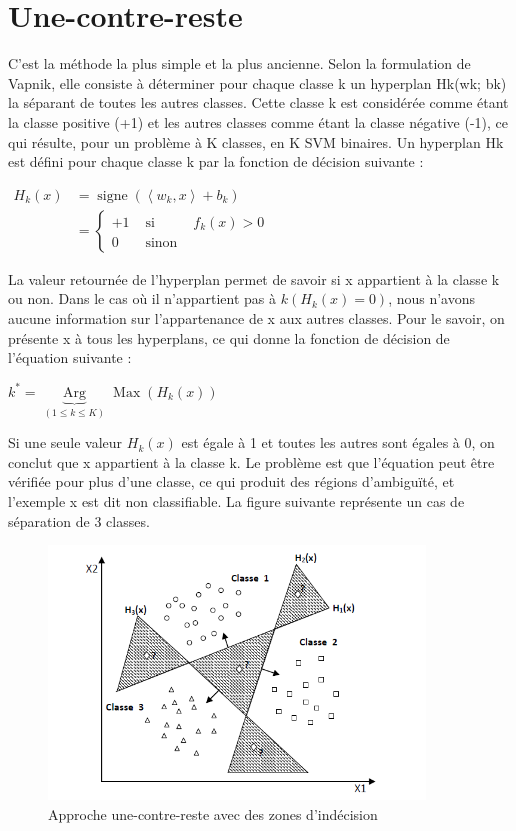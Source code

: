 \documentclass[12pt,a4paper]{report}
\begin{document}
\section{Une-contre-reste}
C’est la méthode la plus simple et la plus ancienne. Selon la formulation de Vapnik,
elle consiste à déterminer pour chaque classe k un hyperplan Hk(wk; bk) la séparant de
toutes les autres classes. Cette classe k est considérée comme étant la classe positive (+1)
et les autres classes comme étant la classe négative (-1), ce qui résulte, pour un problème
à K classes, en K SVM binaires. Un hyperplan Hk est défini pour chaque classe k par la
fonction de décision suivante :
\begin{center}
	$\begin{aligned} H_k(x) & =\operatorname{signe}\left(\left\langle w_k, x\right\rangle+b_k\right) \\ & =\left\{\begin{array}{lll}+1 & \text { si } & f_k(x)>0 \\ 0 & \text { sinon }\end{array}\right.\end{aligned}$
\end{center}
La valeur retournée de l’hyperplan permet de savoir si x appartient à la classe k ou non.
Dans le cas où il n’appartient pas à $ k (H_{k}(x) = 0) $, nous n’avons aucune information sur
l’appartenance de x aux autres classes. Pour le savoir, on présente x à tous les hyperplans,
ce qui donne la fonction de décision de l’équation suivante :
\begin{center}
	$k^*=\underbrace{\operatorname{Arg}}_{(1 \leq k \leq K)} \operatorname{Max}\left(H_k(x)\right)$
\end{center}
Si une seule valeur $ H_{k}(x) $ est égale à 1 et toutes les autres sont égales à 0, on conclut que x
appartient à la classe k. Le problème est que l’équation peut être vérifiée pour plus d’une classe, ce qui produit des régions d’ambiguïté, et l’exemple x est dit non classifiable. La figure suivante représente un cas de séparation de 3 classes.
\begin{figure}[!ht]
	\centering
	\includegraphics[width=10cm]{images/capt4}
	\caption{Approche une-contre-reste avec des zones d’indécision}
\end{figure}
\end{document}
